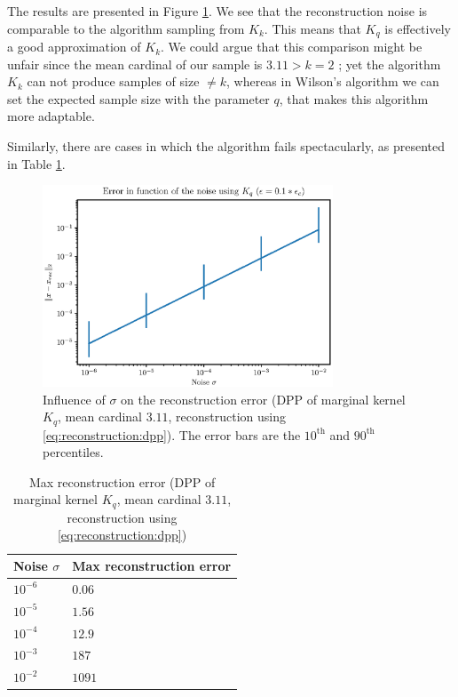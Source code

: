 \documentclass{article}
\begin{document}
The results are presented in Figure \ref{fig:Kq:recerror}. We see that the reconstruction noise is comparable to the algorithm sampling from $K_k$. This means that $K_q$ is effectively a good approximation of $K_k$. We could argue that this comparison might be unfair since the mean cardinal of our sample is $3.11 > k = 2$ ; yet the algorithm $K_k$ can not produce samples of size $\neq k$, whereas in Wilson's algorithm we can set the expected sample size with the parameter $q$, that makes this algorithm more adaptable. 


Similarly, there are cases in which the algorithm fails spectacularly, as presented in Table \ref{tab:Kq:maxrecerror}.


\begin{figure}[ht]
\centering
\includegraphics[height=6cm]{error_function_noise_Kq.eps}
\caption{Influence of $\sigma$ on the reconstruction error (DPP of marginal kernel $K_q$, mean cardinal $3.11$, reconstruction using \eqref{eq:reconstruction:dpp}). The error bars are the $10^\text{th}$ and $90^\text{th}$ percentiles.} \label{fig:Kq:recerror}
\end{figure}


\begin{table}[ht]
  \caption{Max reconstruction error (DPP of marginal kernel $K_q$, mean cardinal $3.11$, reconstruction using \eqref{eq:reconstruction:dpp})}
  \label{tab:Kq:maxrecerror}
  \centering
  \begin{tabular}{ll}
    \toprule
    Noise $\sigma$ &  Max reconstruction error \\
    \midrule
    $10^{-6}$ & $0.06$ \\
    $10^{-5}$ & $1.56$ \\
    $10^{-4}$ & $12.9$ \\
		$10^{-3}$ & $187$ \\
		$10^{-2}$ & $1091$ \\
    \bottomrule
  \end{tabular}
\end{table}
\end{document}
